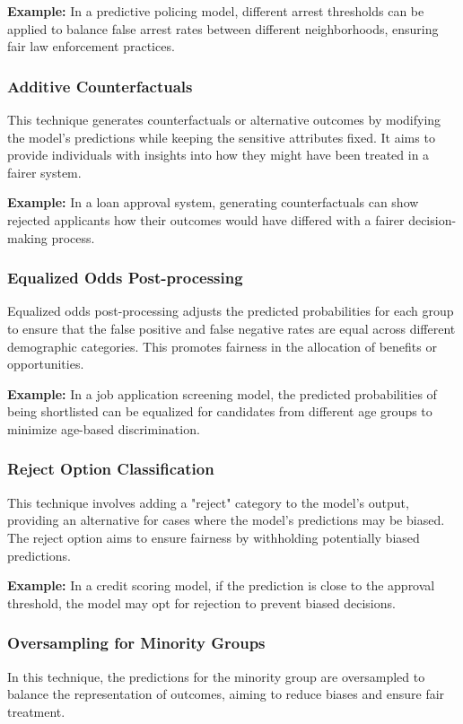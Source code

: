 \documentclass[12pt,a4paper,openright,twoside]{book}
\begin{document}
\textbf{Example:} In a predictive policing model, different arrest thresholds can be applied to balance false arrest rates between different neighborhoods, ensuring fair law enforcement practices.

\subsubsection{Additive Counterfactuals}
This technique generates counterfactuals or alternative outcomes by modifying the model's predictions while keeping the sensitive attributes fixed. It aims to provide individuals with insights into how they might have been treated in a fairer system.

\textbf{Example:} In a loan approval system, generating counterfactuals can show rejected applicants how their outcomes would have differed with a fairer decision-making process.

\subsubsection{Equalized Odds Post-processing}
Equalized odds post-processing adjusts the predicted probabilities for each group to ensure that the false positive and false negative rates are equal across different demographic categories. This promotes fairness in the allocation of benefits or opportunities.

\textbf{Example:} In a job application screening model, the predicted probabilities of being shortlisted can be equalized for candidates from different age groups to minimize age-based discrimination.

\subsubsection{Reject Option Classification}
This technique involves adding a "reject" category to the model's output, providing an alternative for cases where the model's predictions may be biased. The reject option aims to ensure fairness by withholding potentially biased predictions.

\textbf{Example:} In a credit scoring model, if the prediction is close to the approval threshold, the model may opt for rejection to prevent biased decisions.

\subsubsection{Oversampling for Minority Groups}
In this technique, the predictions for the minority group are oversampled to balance the representation of outcomes, aiming to reduce biases and ensure fair treatment.
\end{document}

